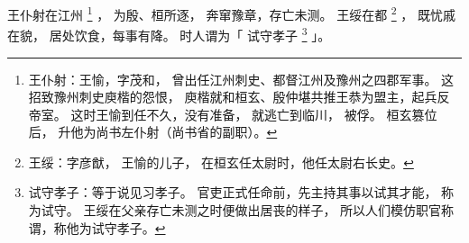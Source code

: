 
\switchcolumn*[\section{}]

王仆射在江州%
\footnote{%
    王仆射：王愉，字茂和，
            曾出任江州刺史、都督江州及豫州之四郡军事。
            这招致豫州刺史庾楷的怨恨，
            庾楷就和桓玄、殷仲堪共推王恭为盟主，起兵反帝室。
            这时王愉到任不久，没有准备，
            就逃亡到临川，
            被俘。
            桓玄篡位后，
            升他为尚书左仆射（尚书省的副职）。
}%
，
为殷、桓所逐，
奔窜豫章，存亡未测。
王绥在都%
\footnote{%
    王绥：字彦猷，
          王愉的儿子，
          在桓玄任太尉时，他任太尉右长史。
}%
，
既忧戚在貌，
居处饮食，每事有降。
时人谓为「
    试守孝子%
    \footnote{%
        试守孝子：等于说见习孝子。
                  官吏正式任命前，先主持其事以试其才能，
                  称为试守。
                  王绥在父亲存亡未测之时便做出居丧的样子，
                  所以人们模仿职官称谓，称他为试守孝子。
    }%
」。

\switchcolumn


